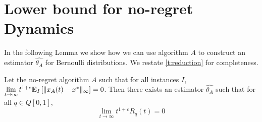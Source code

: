 \section{Lower bound for no-regret Dynamics}\label{app:s:lower_bound}

In the following Lemma we show how we can use algorithm $A$ to construct an
estimator $\hat{\theta_A}$ for Bernoulli distributions.
We restate \ref{t:reduction} for completeness.
\begin{theorem}

  Let the no-regret algorithm $A$ such that
  for all instances $I$, $\lim \limits_{t \rightarrow \infty} t^{1+c}
  \bm{\mathrm{E}}_{I} \left[ \| x_A(t)-x^* \|_{\infty} \right]=0$.  Then there exists an estimator
  $\hat{\theta_A}$ such that for all
  $q \in Q[0,1]$, \[\lim_{t \rightarrow \infty}t^{1+c}R_q(t)=0\]

\end{theorem}

